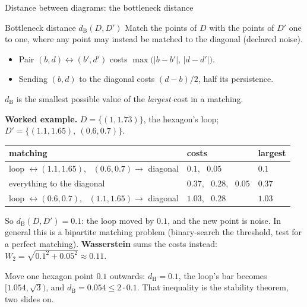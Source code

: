 \documentclass[10pt,aspectratio=169]{beamer}
\newcommand{\dB}{d_{\mathrm{B}}}
\newcommand{\dH}{d_{\mathrm{H}}}
\newcommand{\HL}[1]{\textcolor{blue!70!black}{#1}}
\begin{document}
    \begin{frame}[shrink=5]{Distance between diagrams: the bottleneck distance}
        \begin{block}{Bottleneck distance $\dB(D,D')$}
            Match the points of $D$ with the points of $D'$ one to one, where any point may
            instead be matched to the diagonal (declared noise).
            \begin{itemize}
                \item Pair $(b,d)\leftrightarrow(b',d')$ costs
                $\max\bigl(|b-b'|,\,|d-d'|\bigr)$.
                \item Sending $(b,d)$ to the diagonal costs $(d-b)/2$, half its persistence.
            \end{itemize}
            $\dB$ is the smallest possible value of the \emph{largest} cost in a matching.
        \end{block}
        \small
        \textbf{Worked example.} $D=\{(1,1.73)\}$, the hexagon's loop;
        $D'=\{(1.1,1.65),\ (0.6,0.7)\}$.
        \begin{center}
            \footnotesize
            \begin{tabular}{@{}lll@{}}
                \toprule
                matching & costs & largest \\
                \midrule
                loop $\leftrightarrow(1.1,1.65)$, \ $(0.6,0.7)\to$ diagonal
                    & $0.1$, \ $0.05$ & \HL{$0.1$} \\
                everything to the diagonal & $0.37$, \ $0.28$, \ $0.05$ & $0.37$ \\
                loop $\leftrightarrow(0.6,0.7)$, \ $(1.1,1.65)\to$ diagonal
                    & $1.03$, \ $0.28$ & $1.03$ \\
                \bottomrule
            \end{tabular}
        \end{center}
        So $\dB(D,D')=0.1$: the loop moved by $0.1$, and the new point is noise.
        In general this is a bipartite matching problem (binary-search the threshold, test
        for a perfect matching). \textbf{Wasserstein} sums the costs instead:
        $W_2=\sqrt{0.1^2+0.05^2}\approx0.11$.

        \vspace{0.3em}
        \pause
        \centering Move one hexagon point $0.1$ outwards: $\dH=0.1$, the loop's bar
        becomes $[1.054,\sqrt3)$, and $\dB=0.054\le2\cdot0.1$. That inequality is the stability theorem, two slides on.
    \end{frame}
\end{document}
